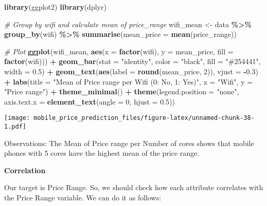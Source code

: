 \documentclass[
]{article}
\newenvironment{Shaded}{\begin{snugshade}}{\end{snugshade}}
\newcommand{\AttributeTok}[1]{\textcolor[rgb]{0.13,0.29,0.53}{#1}}
\newcommand{\CommentTok}[1]{\textcolor[rgb]{0.56,0.35,0.01}{\textit{#1}}}
\newcommand{\DecValTok}[1]{\textcolor[rgb]{0.00,0.00,0.81}{#1}}
\newcommand{\FloatTok}[1]{\textcolor[rgb]{0.00,0.00,0.81}{#1}}
\newcommand{\FunctionTok}[1]{\textcolor[rgb]{0.13,0.29,0.53}{\textbf{#1}}}
\newcommand{\NormalTok}[1]{#1}
\newcommand{\OtherTok}[1]{\textcolor[rgb]{0.56,0.35,0.01}{#1}}
\newcommand{\SpecialCharTok}[1]{\textcolor[rgb]{0.81,0.36,0.00}{\textbf{#1}}}
\newcommand{\StringTok}[1]{\textcolor[rgb]{0.31,0.60,0.02}{#1}}
\begin{document}
\begin{Shaded}
\begin{Highlighting}[]
\FunctionTok{library}\NormalTok{(ggplot2)}
\FunctionTok{library}\NormalTok{(dplyr)}

\CommentTok{\# Group by wifi and calculate mean of price\_range}
\NormalTok{wifi\_mean }\OtherTok{\textless{}{-}}\NormalTok{ data }\SpecialCharTok{\%\textgreater{}\%}
  \FunctionTok{group\_by}\NormalTok{(wifi) }\SpecialCharTok{\%\textgreater{}\%}
  \FunctionTok{summarise}\NormalTok{(}\AttributeTok{mean\_price =} \FunctionTok{mean}\NormalTok{(price\_range))}

\CommentTok{\# Plot}
\FunctionTok{ggplot}\NormalTok{(wifi\_mean, }\FunctionTok{aes}\NormalTok{(}\AttributeTok{x =} \FunctionTok{factor}\NormalTok{(wifi), }\AttributeTok{y =}\NormalTok{ mean\_price, }\AttributeTok{fill =} \FunctionTok{factor}\NormalTok{(wifi))) }\SpecialCharTok{+}
  \FunctionTok{geom\_bar}\NormalTok{(}\AttributeTok{stat =} \StringTok{"identity"}\NormalTok{, }\AttributeTok{color =} \StringTok{"black"}\NormalTok{, }\AttributeTok{fill =} \StringTok{"\#254441"}\NormalTok{, }\AttributeTok{width =} \FloatTok{0.5}\NormalTok{) }\SpecialCharTok{+}
  \FunctionTok{geom\_text}\NormalTok{(}\FunctionTok{aes}\NormalTok{(}\AttributeTok{label =} \FunctionTok{round}\NormalTok{(mean\_price, }\DecValTok{2}\NormalTok{)), }\AttributeTok{vjust =} \SpecialCharTok{{-}}\FloatTok{0.3}\NormalTok{) }\SpecialCharTok{+}
  \FunctionTok{labs}\NormalTok{(}\AttributeTok{title =} \StringTok{"Mean of Price range per Wifi (0: No, 1: Yes)"}\NormalTok{, }
       \AttributeTok{x =} \StringTok{"Wifi"}\NormalTok{, }\AttributeTok{y =} \StringTok{"Price range"}\NormalTok{) }\SpecialCharTok{+}
  \FunctionTok{theme\_minimal}\NormalTok{() }\SpecialCharTok{+}
  \FunctionTok{theme}\NormalTok{(}\AttributeTok{legend.position =} \StringTok{"none"}\NormalTok{, }\AttributeTok{axis.text.x =} \FunctionTok{element\_text}\NormalTok{(}\AttributeTok{angle =} \DecValTok{0}\NormalTok{, }\AttributeTok{hjust =} \FloatTok{0.5}\NormalTok{))}
\end{Highlighting}
\end{Shaded}

\texttt{[image: mobile\_price\_prediction\_files/figure-latex/unnamed-chunk-38-1.pdf]}

Observations: The Mean of Price range per Number of cores shows that
mobile phones with 5 cores have the highest mean of the price range.

\textbf{Correlation}

Our target is Price Range. So, we should check how each attribute
correlates with the Price Range variable. We can do it as follows:
\end{document}
